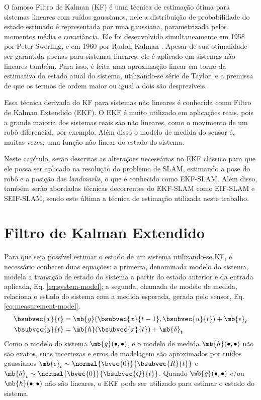 O famoso Filtro de Kalman (KF) é uma técnica de estimação ótima para sistemas lineares com ruídos gaussianos, nele a distribuição de probabilidade do estado estimado é representada por uma gaussiana, parametrizada pelos momentos média e covariância. Ele foi desenvolvido simultaneamente em 1958 por Peter Swerling, e em 1960 por Rudolf Kalman \cite[p.~40]{bongard2006probabilistic}. Apesar de sua otimalidade ser garantida apenas para sistemas lineares, ele é aplicado em sistemas não lineares também. Para isso, é feita uma aproximação linear em torno da estimativa do estado atual do sistema, utilizando-se série de Taylor, e a premissa de que os termos de ordem maior ou igual a dois são desprezíveis.

Essa técnica derivada do KF para sistemas não lineares é conhecida como Filtro de Kalman Extendido (EKF). O EKF é muito utilizado em aplicações reais, pois a grande maioria dos sistemas reais são não lineares, como o movimento de um robô diferencial, por exemplo. Além disso o modelo de medida do sensor é, muitas vezes, uma função não linear do estado do sistema.

Neste capítulo, serão descritas as alterações necessárias no EKF clássico para que ele possa ser aplicado na resolução do problema de SLAM, estimando a pose do robô e a posição das \textit{landmarks}, o que é conhecido como EKF-SLAM. Além disso, também serão abordadas técnicas decorrentes do EKF-SLAM como EIF-SLAM e SEIF-SLAM, sendo este última a técnica de estimação utilizada neste trabalho.

\section{Filtro de Kalman Extendido}
Para que seja possível estimar o estado de um sistema utilizando-se KF, é 
necessário conhecer duas equações: a primeira, denominada modelo do sistema, 
modela a transição de estado do sistema a partir do estado anterior e da entrada aplicada, Eq. \ref{eq:system-model}; a segunda, chamada de modelo de medida, relaciona o estado do sistema com a medida esperada, gerada pelo sensor, Eq. \ref{eq:measurement-model}. 
\begin{align}
  \bsubvec{x}{t} &= \mb{g}(\bsubvec{x}{t-1}, \bsubvec{u}{t}) + \mb{\epsilon}_t
  \label{eq:system-model}\\
  \bsubvec{y}{t} &= \mb{h}(\bsubvec{x}{t}) + \mb{\delta}_t
  \label{eq:measurement-model}
\end{align}
Como o modelo do sistema $\mb{g}(\mathord{\bullet}, \mathord{\bullet})$, e o modelo de medida $\mb{h}(\mathord{\bullet}, \mathord{\bullet})$ não são exatos, suas incertezas e erros de modelagem são aproximados por ruídos gaussianos $\mb{\epsilon}_t \sim \normal{\bvec{0}}{\bsubvec{R}{t}}$ e $\mb{\delta}_t \sim \normal{\bvec{0}}{\bsubvec{Q}{t}}$. Quando $\mb{g}(\mathord{\bullet}, \mathord{\bullet})$ e/ou $\mb{h}(\mathord{\bullet}, \mathord{\bullet})$ não são lineares, o EKF pode ser utilizado para estimar o estado 
do sistema. 

